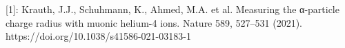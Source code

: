 \documentclass[preview]{standalone}
\begin{document}
\begin{center}
[1]: Krauth, J.J., Schuhmann, K., Ahmed, M.A. et al. Measuring the α-particle charge radius with muonic helium-4 ions. Nature 589, 527–531 (2021). https://doi.org/10.1038/s41586-021-03183-1 \\
\end{center}
\end{document}
